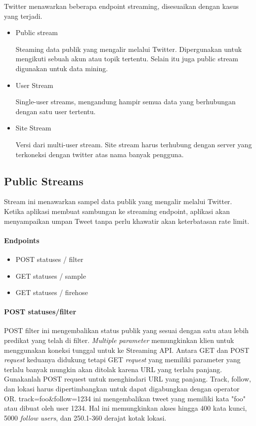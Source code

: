 Twitter menawarkan beberapa endpoint streaming, disesuaikan dengan kasus yang terjadi. 
\begin{itemize}
	\item Public stream
	
	Steaming data publik yang mengalir melalui Twitter. Dipergunakan untuk mengikuti sebuah akun atau topik tertentu. Selain itu juga public stream digunakan untuk data mining.
	\item User Stream
	
	Single-user streams, mengandung hampir semua data yang berhubungan dengan satu user tertentu.
	
	\item Site Stream
	
	Versi dari multi-user stream. Site stream harus terhubung dengan server yang terkoneksi dengan twitter atas nama banyak pengguna.
\end{itemize}


\subsection{Public Streams}
Stream ini menawarkan sampel data publik yang mengalir melalui Twitter. Ketika aplikasi membuat sambungan ke streaming endpoint, aplikasi akan menyampaikan umpan Tweet tanpa perlu khawatir akan keterbatasan rate limit.

\paragraph{Endpoints}
\begin{itemize}
	\item POST statuses / filter
	\item GET statuses / sample
	\item GET statuses / firehose
\end{itemize}

\paragraph{POST statuses/filter}
POST filter ini mengembalikan status publik yang sesuai dengan satu atau lebih predikat yang telah di filter. \textit{Multiple parameter} memungkinkan klien untuk menggunakan koneksi tunggal untuk ke Streaming API. Antara GET dan POST \textit{request} keduanya didukung tetapi GET \textit{request} yang memiliki parameter yang terlalu banyak mungkin akan ditolak karena URL yang terlalu panjang. Gunakanlah POST request untuk menghindari URL yang panjang.
Track, follow, dan lokasi harus dipertimbangkan untuk dapat digabungkan dengan operator OR. track=foo\&follow=1234 ini mengembalikan tweet yang memiliki kata "foo" atau dibuat oleh user 1234.
Hal ini memungkinkan akses hingga 400 kata kunci, 5000 \textit{follow users}, dan 250.1-360 derajat kotak lokasi.

